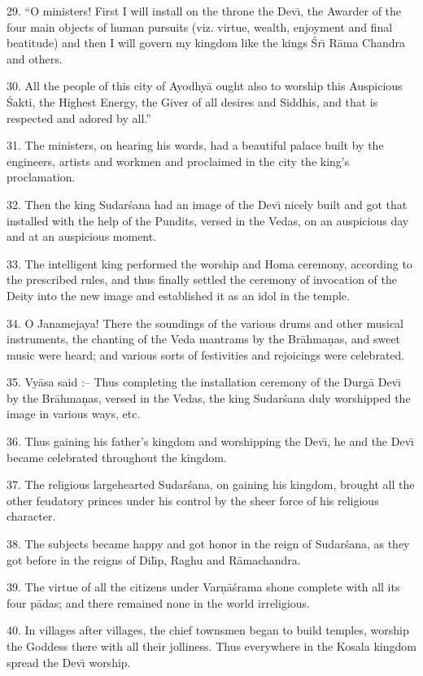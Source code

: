29. ``O ministers! First I will install on the throne the Dev\={\i}, the Awarder of the four main objects of human pursuits (viz. virtue, wealth, enjoyment and final beatitude) and then I will govern my kingdom like the kings \'Sr\={\i} R\=ama Chandra and others.

30. All the people of this city of Ayodhy\=a ought also to worship this Auspicious \'Sakti, the Highest Energy, the Giver of all desires and Siddhis, and that is respected and adored by all.''

31. The ministers, on hearing his words, had a beautiful palace built by the engineers, artists and workmen and proclaimed in the city the king's proclamation.

32. Then the king Sudar\'sana had an image of the Dev\={\i} nicely built and got that installed with the help of the Pundits, versed in the Vedas, on an auspicious day and at an auspicious moment.

33. The intelligent king performed the worship and Homa ceremony, according to the prescribed rules, and thus finally settled the ceremony of invocation of the Deity into the new image and established it as an idol in the temple.

34. O Janamejaya! There the soundings of the various drums and other musical instruments, the chanting of the Veda mantrams by the Br\=ahma\d{n}as, and sweet music were heard; and various sorts of festivities and rejoicings were celebrated.

35. Vy\=asa said :-- Thus completing the installation ceremony of the Durg\=a Dev\={\i} by the Br\=ahma\d{n}as, versed in the Vedas, the king Sudar\'sana duly worshipped the image in various ways, etc.

36. Thus gaining his father's kingdom and worshipping the Dev\={\i}, he and the Dev\={\i} became celebrated throughout the kingdom.

37. The religious largehearted Sudar\'sana, on gaining his kingdom, brought all the other feudatory princes under his control by the sheer force of his religious character.

38. The subjects became happy and got honor in the reign of Sudar\'sana, as they got before in the reigns of Dil\={\i}p, Raghu and R\=amachandra.

39. The virtue of all the citizens under Var\d{n}\=a\'srama shone complete with all its four p\=adas; and there remained none in the world irreligious.

40. In villages after villages, the chief townsmen began to build temples, worship the Goddess there with all their jolliness. Thus everywhere in the Kosala kingdom spread the Dev\={\i} worship.

